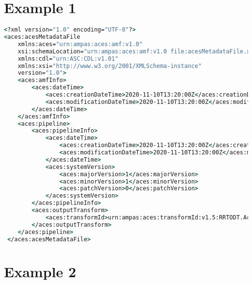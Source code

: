 \label{appendixB}

\section*{Example 1}

\begin{lstlisting}[language=csh]
<?xml version="1.0" encoding="UTF-8"?>
<aces:acesMetadataFile 
    xmlns:aces="urn:ampas:aces:amf:v1.0"
    xsi:schemaLocation="urn:ampas:aces:amf:v1.0 file:acesMetadataFile.xsd"
    xmlns:cdl="urn:ASC:CDL:v1.01"
    xmlns:xsi="http://www.w3.org/2001/XMLSchema-instance"
    version="1.0">
    <aces:amfInfo>
        <aces:dateTime>
            <aces:creationDateTime>2020-11-10T13:20:00Z</aces:creationDateTime>
            <aces:modificationDateTime>2020-11-10T13:20:00Z</aces:modificationDateTime>
        </aces:dateTime>
    </aces:amfInfo>
    <aces:pipeline>
        <aces:pipelineInfo>
            <aces:dateTime>
                <aces:creationDateTime>2020-11-10T13:20:00Z</aces:creationDateTime>
                <aces:modificationDateTime>2020-11-10T13:20:00Z</aces:modificationDateTime>
            </aces:dateTime>
            <aces:systemVersion>
                <aces:majorVersion>1</aces:majorVersion>
                <aces:minorVersion>1</aces:minorVersion>
                <aces:patchVersion>0</aces:patchVersion>
            </aces:systemVersion>
        </aces:pipelineInfo>
        <aces:outputTransform>
            <aces:transformId>urn:ampas:aces:transformId:v1.5:RRTODT.Academy.Rec2020_1000nits_15nits_ST2084.a1.1.0</aces:transformId>
        </aces:outputTransform>
    </aces:pipeline>
 </aces:acesMetadataFile>
\end{lstlisting}

\newpage
\section*{Example 2}

